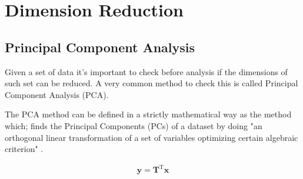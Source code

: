 \chapter{Dimension Reduction}
\label{pca}

\section{Principal Component Analysis}
Given  a set  of data  it's important  to check  before analysis  if the
dimensions of such  set can be reduced. A very  common method to check
this is called Principal Component Analysis (PCA).

The PCA  method can be defined  in a strictly mathematical way as the
method which; finds the Principal  Components (PCs) of  a dataset by
doing  "an orthogonal  linear  transformation of  a  set of  variables
optimizing certain algebraic criterion" \cite{jolliffe2002}.

\begin{gather}
  \mathbf{y} = \mathbf{T}^\mathrm{T} \mathbf{x}
\end{gather}







